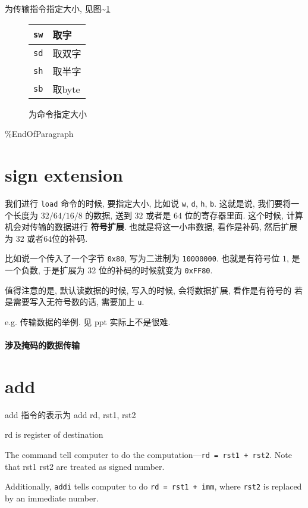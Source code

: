 \documentclass[11pt]{article}
\begin{document}
为传输指令指定大小, 见图\textasciitilde{}\ref{tab:daxiao}
\begin{figure}
		\centering
		\begin{tabular}{|c|l|}
		\hline 
		\texttt{sw} &  取字   \\ \hline 
		\texttt{sd} &  取双字 \\ \hline 
		\texttt{sh} &  取半字 \\ \hline 
		\texttt{sb} &  取byte \\ \hline 
		\end{tabular}
		\caption{为命令指定大小}\label{tab:daxiao}
\end{figure}
\%EndOfParagraph 

\section{sign extension}
\label{sec:org2c57bff}

我们进行 \texttt{load} 命令的时候, 要指定大小, 比如说 \texttt{w}, \texttt{d}, \texttt{h}, \texttt{b}.
这就是说, 我们要将一个长度为 \(32/64/16/8\) 的数据, 送到 \(32\) 或者是 \(64\) 位的寄存器里面. 这个时候, 
计算机会对传输的数据进行 \textbf{符号扩展}. 也就是将这一小串数据, 看作是补码, 然后扩展为 \(32\) 或者\(64\)位的补码. 

比如说一个传入了一个字节 \texttt{0x80}, 写为二进制为 \texttt{10000000}. 也就是有符号位 \(1\), 是一个负数, 于是扩展为 \(32\) 位的补码的时候就变为 \texttt{0xFF80}.

值得注意的是, 默认读数据的时候, 写入的时候, 会将数据扩展, 看作是有符号的
若是需要写入无符号数的话, 需要加上 \texttt{u}. 

e.g. 传输数据的举例. 见 ppt 实际上不是很难. 

\paragraph{涉及掩码的数据传输}

\section{add}
\label{sec:orgabb8348}
add 指令的表示为 
add rd, rst1, rst2

rd is register of destination

The command tell computer to do the computation---\texttt{rd = rst1 + rst2}. Note that rst1 rst2 are treated as signed number. 


Additionally, \texttt{addi} tells computer to do \texttt{rd = rst1 + imm}, where \texttt{rst2} is replaced by an immediate number.
\end{document}
